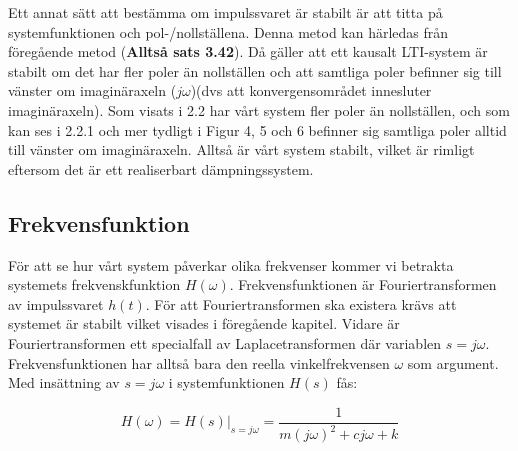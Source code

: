 Ett annat sätt att bestämma om impulssvaret är stabilt är att titta på systemfunktionen och pol-/nollställena. Denna metod kan härledas från föregående metod (\textbf{Alltså sats 3.42}). Då gäller att ett kausalt LTI-system är stabilt om det har fler poler än nollställen och att samtliga poler befinner sig till vänster om imaginäraxeln ($j\omega$)(dvs att konvergensområdet innesluter imaginäraxeln). Som visats i 2.2 har vårt system fler poler än nollställen, och som kan ses i 2.2.1 och mer tydligt i Figur 4, 5 och 6 befinner sig samtliga poler alltid till vänster om imaginäraxeln. Alltså är vårt system stabilt, vilket är rimligt eftersom det är ett realiserbart dämpningssystem.

\subsection{Frekvensfunktion}
För att se hur vårt system påverkar olika frekvenser kommer vi betrakta systemets frekvenskfunktion $H(\omega)$.
Frekvensfunktionen är Fouriertransformen av impulssvaret $h(t)$. För att Fouriertransformen ska existera krävs att systemet är stabilt vilket visades i föregående kapitel. Vidare är Fouriertransformen ett specialfall av Laplacetransformen där variablen $s = j\omega$. Frekvensfunktionen har alltså bara den reella vinkelfrekvensen $\omega$ som argument. Med insättning av $s = j\omega$ i systemfunktionen $H(s)$ fås: 

$$H(\omega)=H(s)\bigg\rvert_{s=j\omega}=\dfrac{1}{m(j\omega)^2+cj\omega+k}$$

\newpage
